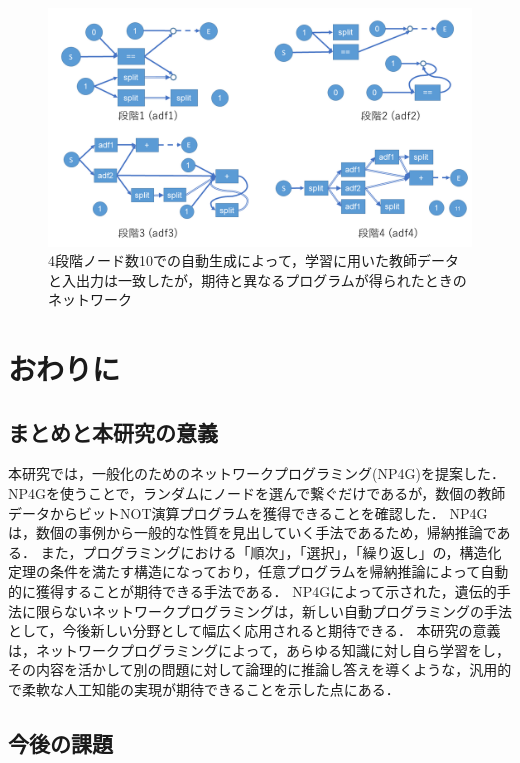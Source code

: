 \documentclass[exploratorypaper]{jsaiart} %
\begin{document}
\begin{figure}[t]
    \begin{center}
        \includegraphics[width=150mm]{out_net_p4n10.png}
    \end{center}
    \capwidth=130mm %
    \caption{4段階ノード数10での自動生成によって，学習に用いた教師データと入出力は一致したが，期待と異なるプログラムが得られたときのネットワーク}
    \label{fig:out_net_p4n10}
\end{figure}

\section{おわりに}
\subsection{まとめと本研究の意義}
本研究では，一般化のためのネットワークプログラミング(NP4G)を提案した．NP4Gを使うことで，ランダムにノードを選んで繋ぐだけであるが，数個の教師データからビットNOT演算プログラムを獲得できることを確認した．
NP4Gは，数個の事例から一般的な性質を見出していく手法であるため，帰納推論である．
また，プログラミングにおける「順次」，「選択」，「繰り返し」の，構造化定理の条件を満たす構造になっており，任意プログラムを帰納推論によって自動的に獲得することが期待できる手法である．
NP4Gによって示された，遺伝的手法に限らないネットワークプログラミングは，新しい自動プログラミングの手法として，今後新しい分野として幅広く応用されると期待できる．
本研究の意義は，ネットワークプログラミングによって，あらゆる知識に対し自ら学習をし，その内容を活かして別の問題に対して論理的に推論し答えを導くような，汎用的で柔軟な人工知能の実現が期待できることを示した点にある．

\subsection{今後の課題}
\end{document}
